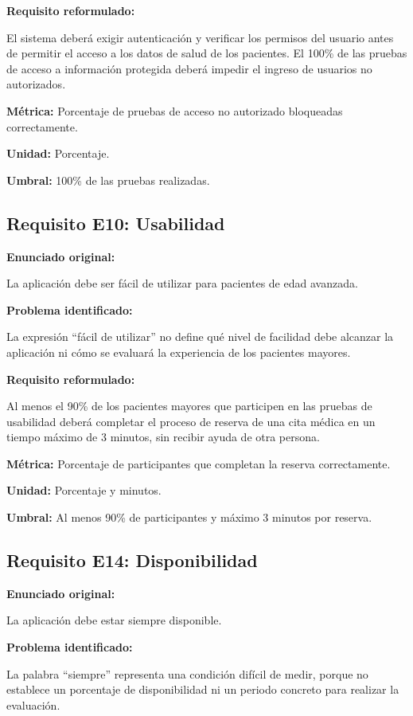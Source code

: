 \documentclass[12pt,a4paper]{article}
\begin{document}
\textbf{Requisito reformulado:}

El sistema deberá exigir autenticación y verificar los
permisos del usuario antes de permitir el acceso a los
datos de salud de los pacientes. El 100\% de las pruebas
de acceso a información protegida deberá impedir el ingreso
de usuarios no autorizados.

\textbf{Métrica:} Porcentaje de pruebas de acceso no autorizado
bloqueadas correctamente.

\textbf{Unidad:} Porcentaje.

\textbf{Umbral:} 100\% de las pruebas realizadas.

\subsection{Requisito E10: Usabilidad}

\textbf{Enunciado original:}

La aplicación debe ser fácil de utilizar para pacientes
de edad avanzada.

\textbf{Problema identificado:}

La expresión ``fácil de utilizar'' no define qué nivel
de facilidad debe alcanzar la aplicación ni cómo se
evaluará la experiencia de los pacientes mayores.

\textbf{Requisito reformulado:}

Al menos el 90\% de los pacientes mayores que participen
en las pruebas de usabilidad deberá completar el proceso
de reserva de una cita médica en un tiempo máximo de
3 minutos, sin recibir ayuda de otra persona.

\textbf{Métrica:} Porcentaje de participantes que completan
la reserva correctamente.

\textbf{Unidad:} Porcentaje y minutos.

\textbf{Umbral:} Al menos 90\% de participantes y máximo
3 minutos por reserva.

\subsection{Requisito E14: Disponibilidad}

\textbf{Enunciado original:}

La aplicación debe estar siempre disponible.

\textbf{Problema identificado:}

La palabra ``siempre'' representa una condición difícil
de medir, porque no establece un porcentaje de disponibilidad
ni un periodo concreto para realizar la evaluación.
\end{document}
